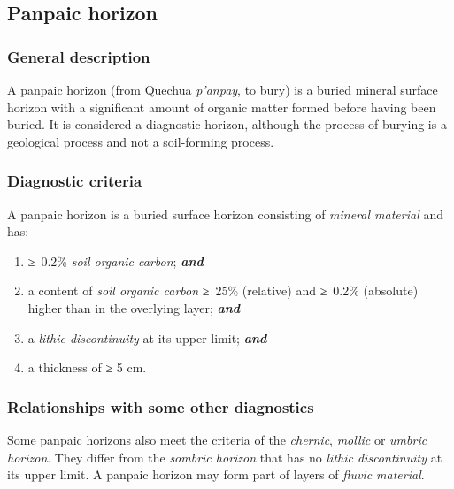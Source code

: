 \documentclass[
  letterpaper,
  DIV=11,
  numbers=noendperiod]{scrreprt}
\providecommand{\tightlist}{%
  \setlength{\itemsep}{0pt}\setlength{\parskip}{0pt}}\usepackage{longtable,booktabs,array}
\begin{document}
\hypertarget{panpaic-horizon}{%
\subsection{Panpaic horizon}\label{panpaic-horizon}}

\hypertarget{general-description-22}{%
\subsubsection{General description}\label{general-description-22}}

A panpaic horizon (from Quechua \emph{p'anpay}, to bury) is a buried
mineral surface horizon with a significant amount of organic matter
formed before having been buried. It is considered a diagnostic horizon,
although the process of burying is a geological process and not a
soil-forming process.

\hypertarget{diagnostic-criteria-22}{%
\subsubsection{Diagnostic criteria}\label{diagnostic-criteria-22}}

A panpaic horizon is a buried surface horizon consisting of
\emph{mineral material} and has:

\begin{enumerate}
\def\labelenumi{\arabic{enumi}.}
\tightlist
\item
  ≥~0.2\% \emph{soil organic carbon}; \textbf{\emph{and}}
\item
  a content of \emph{soil organic carbon} ≥~25\% (relative) and ≥~0.2\%
  (absolute) higher than in the overlying layer; \textbf{\emph{and}}
\item
  a \emph{lithic discontinuity} at its upper limit; \textbf{\emph{and}}
\item
  a thickness of ≥ 5 cm.
\end{enumerate}

\hypertarget{relationships-with-some-other-diagnostics-22}{%
\subsubsection{Relationships with some other
diagnostics}\label{relationships-with-some-other-diagnostics-22}}

Some panpaic horizons also meet the criteria of the \emph{chernic},
\emph{mollic} or \emph{umbric horizon}. They differ from the
\emph{sombric horizon} that has no \emph{lithic discontinuity} at its
upper limit. A panpaic horizon may form part of layers of \emph{fluvic
material}.
\end{document}
